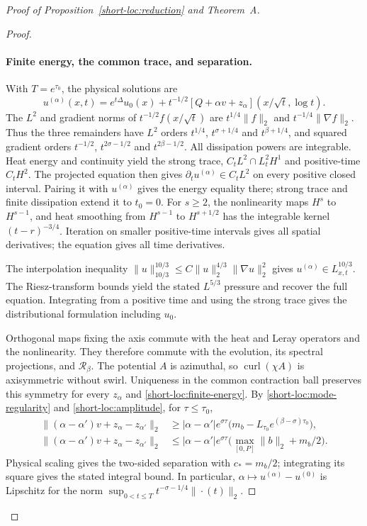 \begin{proof}[Proof of Proposition~\ref{short-loc:reduction} and Theorem~A]
\begin{proof}
\paragraph{Finite energy, the common trace, and separation.}
With $T=e^{\tau_0}$, the physical solutions are
\begin{equation}\label{short-loc:finite-energy}
 u^{(\alpha)}(x,t)=e^{t\Delta}u_0(x)
       +t^{-1/2}[Q+\alpha v+z_\alpha](x/\sqrt t,\log t).
\end{equation}
The $L^2$ and gradient norms of $t^{-1/2}f(x/\sqrt t)$ are
$t^{1/4}\|f\|_2$ and $t^{-1/4}\|\nabla f\|_2$. Thus the three
remainders have $L^2$ orders $t^{1/4}$, $t^{\sigma+1/4}$ and
$t^{\beta+1/4}$, and squared gradient orders $t^{-1/2}$,
$t^{2\sigma-1/2}$ and $t^{2\beta-1/2}$. All dissipation powers are
integrable. Heat energy and continuity yield the strong trace,
$C_tL^2\cap L_t^2H^1$ and positive-time $C_tH^2$.
The projected equation then gives $\partial_tu^{(\alpha)}\in C_tL^2$
on every positive closed interval. Pairing it with $u^{(\alpha)}$ gives
the energy equality there; strong trace and finite dissipation extend
it to $t_0=0$. For $s\ge2$, the nonlinearity maps $H^s$ to $H^{s-1}$,
and heat smoothing from $H^{s-1}$ to $H^{s+1/2}$ has the integrable
kernel $(t-r)^{-3/4}$. Iteration on smaller positive-time intervals
gives all spatial derivatives; the equation gives all time derivatives.

The interpolation inequality
$\|u\|_{10/3}^{10/3}\le C\|u\|_2^{4/3}\|\nabla u\|_2^2$
gives $u^{(\alpha)}\in L^{10/3}_{x,t}$. The Riesz-transform bounds yield
the stated $L^{5/3}$ pressure and recover the full equation.
Integrating from a positive time and using the strong trace gives
the distributional formulation including $u_0$.

Orthogonal maps fixing the axis commute with the heat and
Leray operators and the nonlinearity. They therefore commute with
the evolution, its spectral projections, and $\mathcal R_\beta$.
The potential $A$ is azimuthal, so $\operatorname{curl}(\chi A)$ is
axisymmetric without swirl. Uniqueness in the common contraction ball
preserves this symmetry for every $z_\alpha$ and
\eqref{short-loc:finite-energy}. By \eqref{short-loc:mode-regularity}
and \eqref{short-loc:amplitude}, for $\tau\le\tau_0$,
\[
 \begin{aligned}
 \| (\alpha-\alpha')v+z_\alpha-z_{\alpha'}\|_2
 &\ge |\alpha-\alpha'|e^{\sigma\tau}
     \bigl(m_b-L_{\tau_0}e^{(\beta-\sigma)\tau_0}\bigr),\\
 \| (\alpha-\alpha')v+z_\alpha-z_{\alpha'}\|_2
 &\le |\alpha-\alpha'|e^{\sigma\tau}
     \bigl(\max_{[0,P]}\|b\|_2+m_b/2\bigr).
 \end{aligned}
\]
Physical scaling gives the two-sided separation with $c_*=m_b/2$;
integrating its square gives the stated integral bound. In particular,
$\alpha\mapsto u^{(\alpha)}-u^{(0)}$ is Lipschitz for the norm
$\sup_{0<t\le T}t^{-\sigma-1/4}\|\cdot(t)\|_2$.


\end{proof}
\end{proof}
